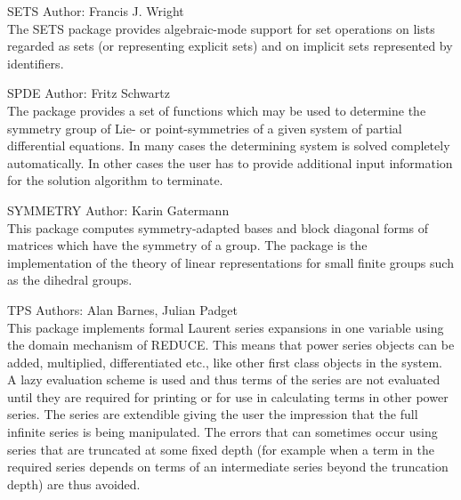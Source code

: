 \begin{Package}{SETS}
Author: Francis J. Wright\\

The SETS package provides algebraic-mode support for set operations on
lists regarded as sets (or representing explicit sets) and on implicit
sets represented by identifiers.
\end{Package}

\begin{Package}{SPDE}
Author: Fritz Schwartz \\

The package  provides a set of functions which may be used to
determine the symmetry group of Lie- or point-symmetries of a given system of
partial differential equations.  In many cases the determining system is
solved completely automatically.  In other cases the user has to provide
additional input information for the solution algorithm to terminate.
\end{Package}

\begin{Package}{SYMMETRY}               
Author: Karin Gatermann\\

This package computes symmetry-adapted bases and block diagonal forms of
matrices which have the symmetry of a group.  The package is the
implementation of the theory of linear representations for small finite
groups such as the dihedral groups.
\end{Package}


\begin{Package}{TPS}
Authors: Alan Barnes, Julian Padget\\

This package implements formal Laurent series expansions in one variable
using the domain mechanism of REDUCE.  This means that power series
objects can be added, multiplied, differentiated etc., like other first
class objects in the system.  A lazy evaluation scheme is used and thus
terms of the series are not evaluated until they are required for printing
or for use in calculating terms in other power series.  The series are
extendible giving the user the impression that the full infinite series is
being manipulated.  The errors that can sometimes occur using series that
are truncated at some fixed depth (for example when a term in the required
series depends on terms of an intermediate series beyond the truncation
depth) are thus avoided.
\end{Package}

